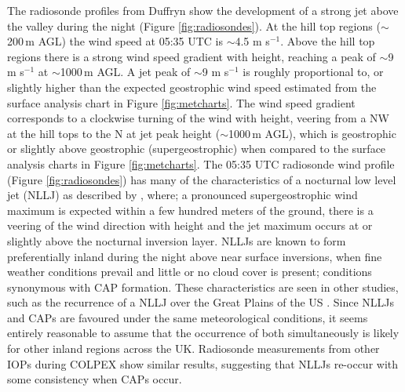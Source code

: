 \documentclass[times]{qjrms4}
\begin{document}
The radiosonde profiles from Duffryn show the development of a strong jet above the valley during the night (Figure \ref{fig:radiosondes}). At the hill top regions ($\sim$200$\,\mbox{m}$ AGL) the wind speed at 05:35 UTC is $\sim$4.5 m s$^{-1}$. Above the hill top regions there is a strong wind speed gradient with height, reaching a peak of $\sim$9 m s$^{-1}$ at $\sim$1000$\,\mbox{m}$ AGL. A jet peak of $\sim$9 m s$^{-1}$ is roughly proportional to, or slightly higher than the expected geostrophic wind speed estimated from the surface analysis chart in Figure \ref{fig:metcharts}. The wind speed gradient corresponds to a clockwise turning of the wind with height, veering from a NW at the hill tops to the N at jet peak height ($\sim$1000$\,\mbox{m}$ AGL), which is geostrophic or slightly above geostrophic (supergeostrophic) when compared to the surface analysis charts in Figure \ref{fig:metcharts}. The 05:35 UTC radiosonde wind profile (Figure \ref{fig:radiosondes}) has many of the characteristics of a nocturnal low level jet (NLLJ) as described by \citet{thorpe1977nocturnal}, where; a pronounced supergeostrophic wind maximum is expected within a few hundred meters of the ground, there is a veering of the wind direction with height and the jet maximum occurs at or slightly above the nocturnal inversion layer. NLLJs are known to form preferentially inland during the night above near surface inversions, when fine weather conditions prevail and little or no cloud cover is present; conditions synonymous with CAP formation. These characteristics are seen in other studies, such as the recurrence of a NLLJ over the Great Plains of the US \citep[p 168]{whiteman2000mountain}. Since NLLJs and CAPs are favoured under the same meteorological conditions, it seems entirely reasonable to assume that the occurrence of both simultaneously is likely for other inland regions across the UK. Radiosonde measurements from other IOPs during COLPEX show similar results, suggesting that NLLJs re-occur with some consistency when CAPs occur.
\end{document}
